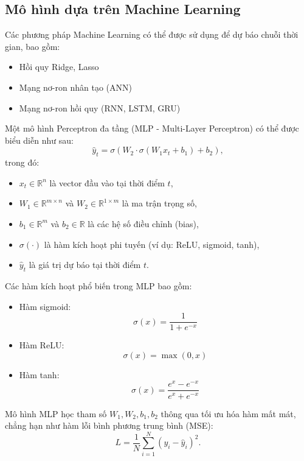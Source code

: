 \subsection{Mô hình dựa trên Machine Learning}
Các phương pháp Machine Learning có thể được sử dụng để dự báo chuỗi thời gian, bao gồm:
\begin{itemize}
    \item Hồi quy Ridge, Lasso
    \item Mạng nơ-ron nhân tạo (ANN)
    \item Mạng nơ-ron hồi quy (RNN, LSTM, GRU)
\end{itemize}

Một mô hình Perceptron đa tầng (MLP - Multi-Layer Perceptron) có thể được biểu diễn như sau:
\begin{equation}
    \hat{y}_t = \sigma \left(W_2 \cdot \sigma(W_1 x_t + b_1) + b_2 \right),
\end{equation}
trong đó:
\begin{itemize}
    \item $x_t \in \mathbb{R}^n$ là vector đầu vào tại thời điểm $t$,
    \item $W_1 \in \mathbb{R}^{m \times n}$ và $W_2 \in \mathbb{R}^{1 \times m}$ là ma trận trọng số,
    \item $b_1 \in \mathbb{R}^m$ và $b_2 \in \mathbb{R}$ là các hệ số điều chỉnh (bias),
    \item $\sigma(\cdot)$ là hàm kích hoạt phi tuyến (ví dụ: ReLU, sigmoid, tanh),
    \item $\hat{y}_t$ là giá trị dự báo tại thời điểm $t$.
\end{itemize}

Các hàm kích hoạt phổ biến trong MLP bao gồm:
\begin{itemize}
    \item Hàm sigmoid:
    \begin{equation}
        \sigma(x) = \frac{1}{1 + e^{-x}}
    \end{equation}
    \item Hàm ReLU:
    \begin{equation}
        \sigma(x) = \max(0, x)
    \end{equation}
    \item Hàm tanh:
    \begin{equation}
        \sigma(x) = \frac{e^x - e^{-x}}{e^x + e^{-x}}
    \end{equation}
\end{itemize}

Mô hình MLP học tham số $W_1, W_2, b_1, b_2$ thông qua tối ưu hóa hàm mất mát, chẳng hạn như hàm lỗi bình phương trung bình (MSE):
\begin{equation}
    L = \frac{1}{N} \sum_{i=1}^{N} (y_i - \hat{y}_i)^2.
\end{equation}



